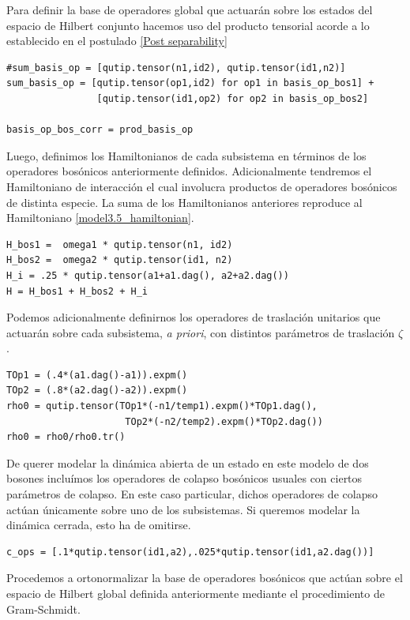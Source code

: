 \documentclass{report} %
\numberwithin{equation}{section}
\begin{document}
Para definir la base de operadores global que actuarán sobre los estados del espacio de Hilbert conjunto  hacemos uso del producto tensorial acorde a lo establecido en el postulado \ref{Post separability}

\begin{verbatim}
#sum_basis_op = [qutip.tensor(n1,id2), qutip.tensor(id1,n2)]
sum_basis_op = [qutip.tensor(op1,id2) for op1 in basis_op_bos1] +
                [qutip.tensor(id1,op2) for op2 in basis_op_bos2]

basis_op_bos_corr = prod_basis_op
\end{verbatim}

Luego, definimos los Hamiltonianos de cada subsistema en términos de los operadores bosónicos anteriormente definidos. Adicionalmente tendremos el Hamiltoniano de interacción el cual involucra productos de operadores bosónicos de distinta especie. La suma de los Hamiltonianos anteriores reproduce al Hamiltoniano \eqref{model3.5_hamiltonian}. 

\begin{verbatim}
H_bos1 =  omega1 * qutip.tensor(n1, id2)
H_bos2 =  omega2 * qutip.tensor(id1, n2)
H_i = .25 * qutip.tensor(a1+a1.dag(), a2+a2.dag())
H = H_bos1 + H_bos2 + H_i
\end{verbatim}

Podemos adicionalmente definirnos los operadores de traslación unitarios \cite{CohenTannoudji1989} que actuarán sobre cada subsistema, \textit{a priori}, con distintos parámetros de traslación $\zeta$.

\begin{verbatim}
TOp1 = (.4*(a1.dag()-a1)).expm()
TOp2 = (.8*(a2.dag()-a2)).expm()
rho0 = qutip.tensor(TOp1*(-n1/temp1).expm()*TOp1.dag(), 
                     TOp2*(-n2/temp2).expm()*TOp2.dag())
rho0 = rho0/rho0.tr()

\end{verbatim}

De querer modelar la dinámica abierta de un estado en este modelo de dos bosones incluímos los operadores de colapso bosónicos usuales con ciertos parámetros de colapso. En este caso particular, dichos operadores de colapso actúan únicamente sobre uno de los subsistemas. Si queremos modelar la dinámica cerrada, esto ha de omitirse. 
\begin{verbatim}
c_ops = [.1*qutip.tensor(id1,a2),.025*qutip.tensor(id1,a2.dag())]
\end{verbatim}

Procedemos a ortonormalizar la base de operadores bosónicos que actúan sobre el espacio de Hilbert global definida anteriormente mediante el procedimiento de Gram-Schmidt. 
\end{document}
